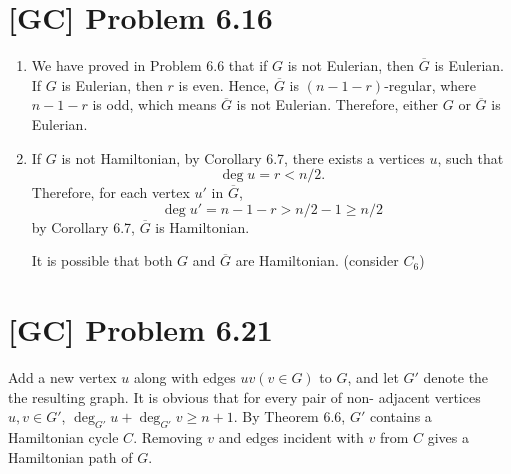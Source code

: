 \documentclass[a4paper,11pt,twocolumn]{article}
\begin{document}
  \section{[GC] Problem 6.16}
  \begin{enumerate}
    \item We have proved in Problem 6.6 that if $G$ is not Eulerian, then $\overline{G}$ is Eulerian. If $G$ is Eulerian, then $r$ is even. Hence, $\overline{G}$ is $(n-1-r)$-regular, where $n-1-r$ is odd, which means $\overline{G}$ is not Eulerian. Therefore, either $G$ or $\overline{G}$ is Eulerian.
    \item If $G$ is not Hamiltonian, by Corollary 6.7, there exists a vertices $u$, such that
    $$ \deg u  = r < n / 2.$$
    Therefore, for each vertex $u'$ in $\overline{G}$,
    $$ \deg u'  = n - 1 - r > n/2 - 1 \geq n/2$$
    by Corollary 6.7, $\overline{G}$ is Hamiltonian. \par
    It is possible that both $G$ and $\overline{G}$ are Hamiltonian. (consider $C_6$)
  \end{enumerate}
  
  \section{[GC] Problem 6.21}
  Add a new vertex $u$ along with edges $uv (v \in G)$ to $G$, and let $G'$ denote the the resulting graph. It is obvious that for every pair of non- adjacent vertices $u, v \in G'$, $\deg_{G'} u + \deg_{G'} v \geq n + 1$. By Theorem 6.6, $G'$ contains a Hamiltonian cycle $C$. Removing $v$ and edges incident with $v$ from $C$ gives a Hamiltonian path of $G$.
\end{document}
